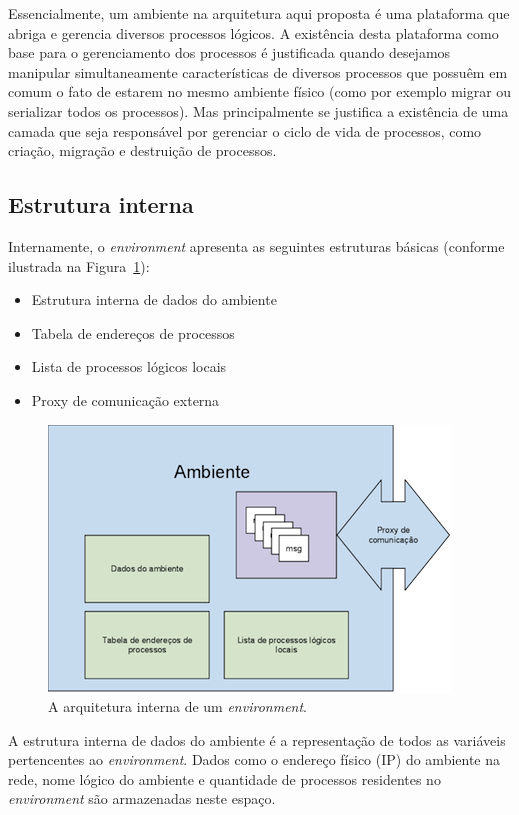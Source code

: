 Essencialmente, um ambiente na arquitetura aqui proposta é uma plataforma que abriga e gerencia diversos processos lógicos. A existência desta plataforma como base para o gerenciamento dos processos é justificada quando desejamos manipular simultaneamente características de diversos processos que possuêm em comum o fato de estarem no mesmo ambiente físico (como por exemplo migrar ou serializar todos os processos). Mas principalmente se justifica a existência de uma camada que seja responsável por gerenciar o ciclo de vida de processos, como criação, migração e destruição de processos.

\subsection{Estrutura interna}

Internamente, o \textit{environment} apresenta as seguintes estruturas básicas (conforme ilustrada na Figura~\ref{fig:environment_1}):

\begin{itemize}
\item Estrutura interna de dados do ambiente
\item Tabela de endereços de processos
\item Lista de processos lógicos locais
\item Proxy de comunicação externa
\end{itemize}

\begin{figure}
  \centerline{\includegraphics{Environment_1.png}}
  \caption{A arquitetura interna de um \textit{environment}.}
\label{fig:environment_1}
\end{figure}

A estrutura interna de dados do ambiente é a representação de todos as variáveis pertencentes ao \textit{environment}. Dados como o endereço físico (IP) do ambiente na rede, nome lógico do ambiente e quantidade de processos residentes no \textit{environment} são armazenadas neste espaço.

